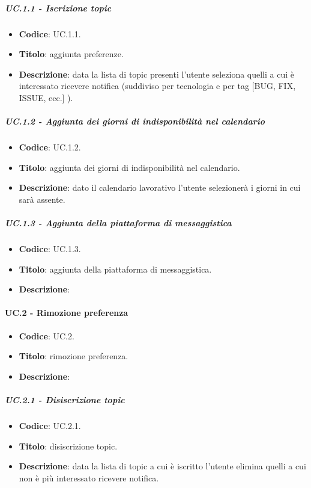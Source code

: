 	\subparagraph{UC\theuccount.1.1 - Iscrizione topic}
	\begin{itemize}
		\item \textbf{Codice}: UC\theuccount.1.1.
		\item \textbf{Titolo}: aggiunta preferenze.
		\item \textbf{Descrizione}: data la lista di topic presenti l'utente seleziona quelli a cui è interessato ricevere notifica (suddiviso per tecnologia e per tag [BUG, FIX, ISSUE, ecc.] ).
	\end{itemize}
		
			
	\subparagraph{UC\theuccount.1.2 - Aggiunta dei giorni di indisponibilità nel calendario} 
	\begin{itemize}
		\item \textbf{Codice}: UC\theuccount.1.2.
		\item \textbf{Titolo}: aggiunta dei giorni di indisponibilità nel calendario.
		\item \textbf{Descrizione}: dato il calendario lavorativo l'utente selezionerà i giorni in cui sarà assente.
	\end{itemize}
			
	\subparagraph{UC\theuccount.1.3 - Aggiunta della piattaforma di messaggistica}
	\begin{itemize}
		\item \textbf{Codice}: UC\theuccount.1.3.
		\item \textbf{Titolo}: aggiunta della piattaforma di messaggistica.
		\item \textbf{Descrizione}: 
	\end{itemize}
			



	\paragraph{UC\theuccount.2 - Rimozione preferenza}
	\begin{itemize}
		\item \textbf{Codice}: UC\theuccount.2.
		\item \textbf{Titolo}: rimozione preferenza.
		\item \textbf{Descrizione}: 
	\end{itemize}
	
	
	\subparagraph{UC\theuccount.2.1 - Disiscrizione topic}
	\begin{itemize}
		\item \textbf{Codice}: UC\theuccount.2.1.
		\item \textbf{Titolo}: disiscrizione topic.
		\item \textbf{Descrizione}: data la lista di topic a cui è iscritto l'utente elimina quelli a cui non è più interessato ricevere notifica.
	\end{itemize}
	
